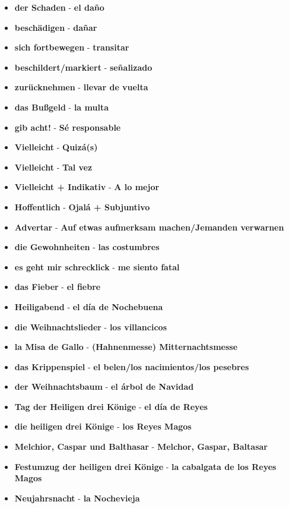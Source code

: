 \documentclass{article}
\begin{document}
\begin{multicols}{2}
\begin{itemize}
		\item{\textbf{der Schaden} - \textbf{el daño}}
		\item{\textbf{beschädigen} - \textbf{dañar}}
		\item{\textbf{sich fortbewegen} - \textbf{transitar}}
		\item{\textbf{beschildert/markiert} - \textbf{señalizado}}
		\item{\textbf{zurücknehmen} - \textbf{llevar de vuelta}}
		\item{\textbf{das Bußgeld} - \textbf{la multa}}
		\item{\textbf{gib acht!} - \textbf{Sé responsable}}
		\item{\textbf{Vielleicht} - \textbf{Quizá(s)}}
		\item{\textbf{Vielleicht} - \textbf{Tal vez}}
		\item{\textbf{Vielleicht + Indikativ} - \textbf{A lo mejor}}
		\item{\textbf{Hoffentlich} - \textbf{Ojalá + Subjuntivo}}
		\item{\textbf{Advertar} - \textbf{Auf etwas aufmerksam machen/Jemanden verwarnen}}
		\item{\textbf{die Gewohnheiten} - \textbf{las costumbres}}
		\item{\textbf{es geht mir schrecklick} - \textbf{me siento fatal}}
		\item{\textbf{das Fieber} - \textbf{el fiebre}}
		\item{\textbf{Heiligabend} - \textbf{el día de Nochebuena}}
		\item{\textbf{die Weihnachtslieder} - \textbf{los villancicos}}
		\item{\textbf{la Misa de Gallo} - \textbf{(Hahnenmesse) Mitternachtsmesse}}
		\item{\textbf{das Krippenspiel} - \textbf{el belen/los nacimientos/los pesebres}}
		\item{\textbf{der Weihnachtsbaum} - \textbf{el árbol de Navidad}}
		\item{\textbf{Tag der Heiligen drei Könige} - \textbf{el día de Reyes}}
		\item{\textbf{die heiligen drei Könige} - \textbf{los Reyes Magos}}
		\item{\textbf{Melchior, Caspar und Balthasar} - \textbf{Melchor, Gaspar, Baltasar}}
		\item{\textbf{Festumzug der heiligen drei Könige} - \textbf{la cabalgata de los Reyes Magos}}
		\item{\textbf{Neujahrsnacht} - \textbf{la Nochevieja}}

\end{itemize}
\end{multicols}
\end{document}
